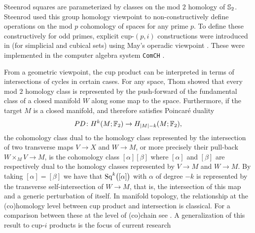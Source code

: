\begin{remark}
	Steenrod squares are parameterized by classes on the mod $2$ homology of $\mathbb{S}_2$.
	Steenrod used this group homology viewpoint to non-constructively define operations on the mod $p$ cohomology of spaces \cite{steenrod1952reduced, steenrod1953cyclic, steenrod1962cohomology} for any prime $p$.
	To define these constructively for odd primes, explicit cup-$(p,i)$ constructions were introduced in \cite{medina2021may_st} (for simplicial and cubical sets) using May's operadic viewpoint \cite{may1970general}.
	These were implemented in the computer algebra system \texttt{ComCH} \cite{medina2021comch}.
\end{remark}

\begin{remark}
	From a geometric viewpoint, the cup product can be interpreted in terms of intersections of cycles in certain cases.
	For any space, Thom showed that every mod $2$ homology class is represented by the push-forward of the fundamental class of a closed manifold $W$ along some map to the space.
	Furthermore, if the target $M$ is a closed manifold, and therefore satisfies Poincar\'{e} duality
	\[
	PD \colon H^k(M ;{\mathbb{F}_2}) \to H_{\lvert M\rvert-k}(M; {\mathbb{F}_2}),
	\]
	the cohomology class dual to the homology class represented by the intersection of two transverse maps $V \to X$ and $W \to M$, or more precisely their pull-back $W \times_M V \to M$, is the cohomology class $[\alpha] [\beta]$ where $[\alpha]$ and $[\beta]$ are respectively dual to the homology classes represented by $V \to M$ and $W \to M$.
	By taking $[\alpha] = [\beta]$ we have that $\mathrm{Sq}^k \big( [\alpha] \big)$ with $\alpha$ of degree $-k$ is represented by the transverse self-intersection of $W \to M$, that is, the intersection of this map and a generic perturbation of itself.
	In manifold topology, the relationship at the (co)homology level between cup product and intersection is classical.
	For a comparison between these at the level of (co)chain see \cite{medina2021flowing}.
	A generalization of this result to cup-$i$ products is the focus of current research \cite{medina2022foundations}
\end{remark}